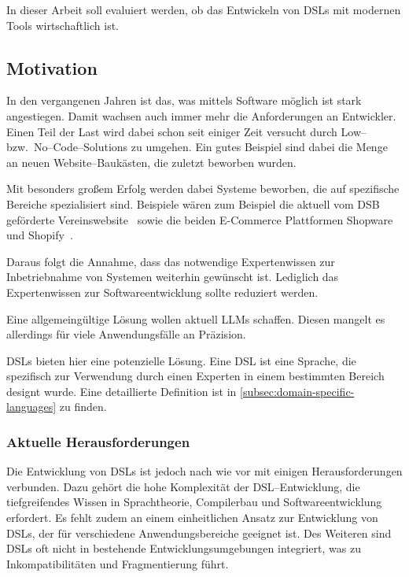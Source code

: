 In dieser Arbeit soll evaluiert werden, ob das Entwickeln von \acp{DSL} mit modernen Tools wirtschaftlich ist.

\subsection{Motivation}\label{subsec:motivation}
In den vergangenen Jahren ist das, was mittels Software möglich ist stark angestiegen.
Damit wachsen auch immer mehr die Anforderungen an Entwickler.
Einen Teil der Last wird dabei schon seit einiger Zeit versucht durch Low-- bzw.\ No--Code--Solutions zu umgehen.
Ein gutes Beispiel sind dabei die Menge an neuen Website--Baukästen, die zuletzt beworben wurden. \autocite{p-2024}

Mit besonders großem Erfolg werden dabei Systeme beworben, die auf spezifische Bereiche spezialisiert sind.
Beispiele wären zum Beispiel die aktuell vom DSB geförderte Vereinswebsite~\autocite{deutscher-olympischer-sportbund-ev-no-date} sowie die beiden E-Commerce Plattformen Shopware~\autocite{shopware-ag-no-date} und Shopify~\autocite{shopify-international-ltd-no-date}.

Daraus folgt die Annahme, dass das notwendige Expertenwissen zur Inbetriebnahme von Systemen weiterhin gewünscht ist.
Lediglich das Expertenwissen zur Softwareentwicklung sollte reduziert werden.

Eine allgemeingültige Lösung wollen aktuell \acp{LLM} schaffen.
Diesen mangelt es allerdings für viele Anwendungsfälle an Präzision.

\acp{DSL} bieten hier eine potenzielle Lösung.
Eine \ac{DSL} ist eine Sprache, die spezifisch zur Verwendung durch einen Experten in einem bestimmten Bereich designt wurde.
Eine detaillierte Definition ist in \autoref{subsec:domain-specific-languages} zu finden.

\subsubsection{Aktuelle Herausforderungen}
Die Entwicklung von \acp{DSL} ist jedoch nach wie vor mit einigen Herausforderungen verbunden.
Dazu gehört die hohe Komplexität der \acs{DSL}--Entwicklung, die tiefgreifendes Wissen in Sprachtheorie, Compilerbau und Softwareentwicklung erfordert.
Es fehlt zudem an einem einheitlichen Ansatz zur Entwicklung von \acp{DSL}, der für verschiedene Anwendungsbereiche geeignet ist.
Des Weiteren sind \acp{DSL} oft nicht in bestehende Entwicklungsumgebungen integriert, was zu Inkompatibilitäten und Fragmentierung führt.

